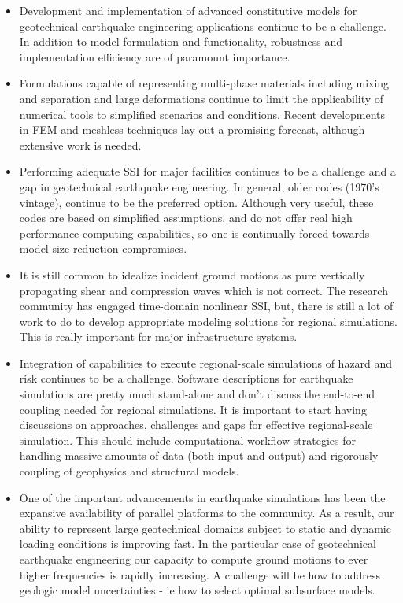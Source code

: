 \begin{itemize}

\item Development and implementation of advanced constitutive models for geotechnical earthquake engineering applications continue to be a challenge. In addition to model formulation and functionality, robustness and implementation efficiency are of paramount importance.  

\item Formulations capable of representing multi-phase materials including mixing and separation and large deformations continue to limit the applicability of numerical tools to simplified scenarios and conditions. Recent developments in FEM and meshless techniques lay out a promising forecast, although extensive work is needed.  

\item Performing adequate SSI for major facilities continues to be a challenge and a gap in geotechnical earthquake engineering. In general, older codes (1970's vintage), continue to be the preferred option. Although very useful, these codes are based on simplified assumptions, and do not offer real high performance computing capabilities, so one is continually forced towards model size reduction compromises.

\item It is still common to idealize incident ground motions as pure vertically propagating shear and compression waves which is not correct. The research community has engaged time-domain nonlinear SSI, but, there is still a lot of work to do to develop appropriate modeling solutions for regional simulations. This is really important for major infrastructure systems.

\item Integration of capabilities to execute regional-scale simulations of hazard and risk continues to be a challenge. Software descriptions for earthquake simulations are pretty much stand-alone and don't discuss the end-to-end coupling needed for regional simulations. It is important to start having discussions on approaches, challenges and gaps for effective regional-scale simulation. This should include computational workflow strategies for handling massive amounts of data (both input and output) and rigorously coupling of geophysics and structural models.

\item One of the important advancements in earthquake simulations has been the expansive availability of parallel platforms to the community. As a result, our ability to represent large geotechnical domains subject to static and dynamic loading conditions is improving fast. In the particular case of geotechnical earthquake engineering our capacity to compute ground motions to ever higher frequencies is rapidly increasing. A challenge will be how to address geologic model uncertainties - ie how to select optimal subsurface models.

\end{itemize}

